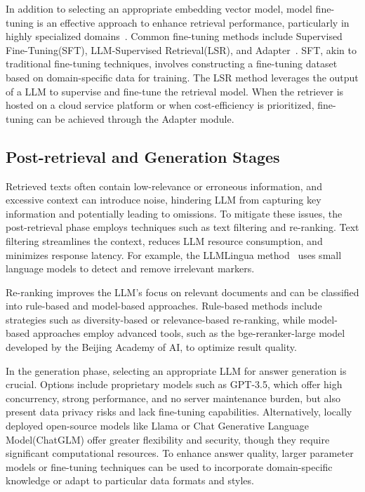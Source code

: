 In addition to selecting an appropriate embedding vector model, model fine-tuning is an effective approach to enhance retrieval performance, particularly in highly specialized domains~\cite{houlsby2019parameter}. Common fine-tuning methods include Supervised Fine-Tuning(SFT), LLM-Supervised Retrieval(LSR), and Adapter~\cite{jiang2023llmlingua}. SFT, akin to traditional fine-tuning techniques, involves constructing a fine-tuning dataset based on domain-specific data for training. The LSR method leverages the output of a LLM to supervise and fine-tune the retrieval model. When the retriever is hosted on a cloud service platform or when cost-efficiency is prioritized, fine-tuning can be achieved through the Adapter module.



\subsection{Post-retrieval and Generation Stages}

Retrieved texts often contain low-relevance or erroneous information, and excessive context can introduce noise, hindering LLM from capturing key information and potentially leading to omissions. To mitigate these issues, the post-retrieval phase employs techniques such as text filtering and re-ranking. Text filtering streamlines the context, reduces LLM resource consumption, and minimizes response latency. For example, the LLMLingua method~\cite{liu2024lost} uses small language models to detect and remove irrelevant markers.


Re-ranking improves the LLM's focus on relevant documents and can be classified into rule-based and model-based approaches. Rule-based methods include strategies such as diversity-based or relevance-based re-ranking, while model-based approaches employ advanced tools, such as the bge-reranker-large model developed by the Beijing Academy of AI, to optimize result quality.

In the generation phase, selecting an appropriate LLM for answer generation is crucial. Options include proprietary models such as GPT-3.5, which offer high concurrency, strong performance, and no server maintenance burden, but also present data privacy risks and lack fine-tuning capabilities. Alternatively, locally deployed open-source models like Llama or Chat Generative Language Model(ChatGLM) offer greater flexibility and security, though they require significant computational resources. To enhance answer quality, larger parameter models or fine-tuning techniques can be used to incorporate domain-specific knowledge or adapt to particular data formats and styles.


 
